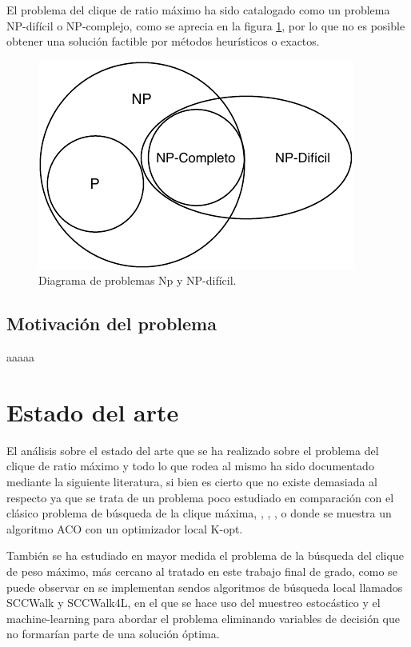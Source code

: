 El problema del clique de ratio máximo ha sido catalogado como un problema NP-difícil o NP-complejo, como se aprecia en la figura \ref{fig:np-dificil}, por lo que no es posible obtener una solución factible por métodos heurísticos o exactos.

\begin{figure}[H]
	\centering
	\includegraphics{Figures/problemas-np-hard.pdf}
	\caption{Diagrama de problemas Np y NP-difícil.}
	\label{fig:np-dificil}
\end{figure}

\subsection{Motivación del problema}

aaaaa

\section{Estado del arte}
El análisis sobre el estado del arte que se ha realizado sobre el problema del clique de ratio máximo y todo lo que rodea al mismo ha sido documentado mediante la siguiente literatura, si bien es cierto que no existe demasiada al respecto ya que se trata de un problema poco estudiado en comparación con el clásico problema de búsqueda de la clique máxima, \cite{mcp-batsyn}, \cite{mcp-ryp}, \cite{mcp-neuro}, o \cite{mcp-ants} donde se muestra un algoritmo \gls{ACO} con un optimizador local K-opt.

También se ha estudiado en mayor medida el problema de la búsqueda del clique de peso máximo, más cercano al tratado en este trabajo final de grado, como se puede observar en \cite{mwcp-ls} se implementan sendos algoritmos de búsqueda local llamados SCCWalk y SCCWalk4L, \cite{mwcp-ml} en el que se hace uso del muestreo estocástico y el machine-learning para abordar el problema eliminando variables de decisión que no formarían parte de una solución óptima.

